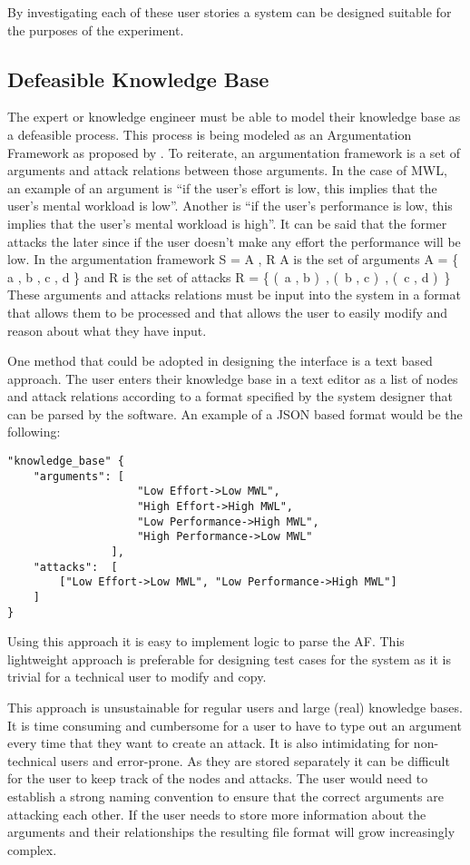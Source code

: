 By investigating each of these user stories a system can be designed suitable for the purposes of the experiment.

\subsection{Defeasible Knowledge Base}
\label{sec:def_kb}
The expert or knowledge engineer must be able to model their knowledge base as a defeasible process. This process is being modeled as an Argumentation Framework as proposed by \cite{dung1995acceptability}. To reiterate, an argumentation framework is a set of arguments and attack relations between those arguments. In the case of MWL, an example of an argument is ``if the user's effort is low, this implies that the user's mental workload is low''. Another is ``if the user's performance is low, this implies that the user's mental workload is high''. It can be said that the former attacks the later since if the user doesn't make any effort the performance will be low. In the argumentation framework S = \langle A , R \rangle A is the set of arguments A = \{ a , b , c , d \} and R is the set of attacks R = \{ (\, a , b )\, , (\, b , c )\, , (\, c , d )\, \}  These arguments and attacks relations must be input into the system in a format that allows them to be processed and that allows the user to easily modify and reason about what they have input.

One method that could be adopted in designing the interface is a text based approach. The user enters their knowledge base in a text editor as a list of nodes and attack relations according to a format specified by the system designer that can be parsed by the software. An example of a JSON based format would be the following:

\begin{lstlisting}
"knowledge_base" {
    "arguments": [
                    "Low Effort->Low MWL", 
                    "High Effort->High MWL", 
                    "Low Performance->High MWL", 
                    "High Performance->Low MWL"
                ],
    "attacks":  [
        ["Low Effort->Low MWL", "Low Performance->High MWL"]
    ]
}
\end{lstlisting}

Using this approach it is easy to implement logic to parse the AF. This lightweight approach is preferable for designing test cases for the system as it is trivial for a technical user to modify and copy. 

This approach is unsustainable for regular users and large (real) knowledge bases. It is time consuming and cumbersome for a user to have to type out an argument every time that they want to create an attack. It is also intimidating for non-technical users and error-prone. As they are stored separately it can be difficult for the user to keep track of the nodes and attacks. The user would need to establish a strong naming convention to ensure that the correct arguments are attacking each other. If the user needs to store more information about the arguments and their relationships the resulting file format will grow increasingly complex.

